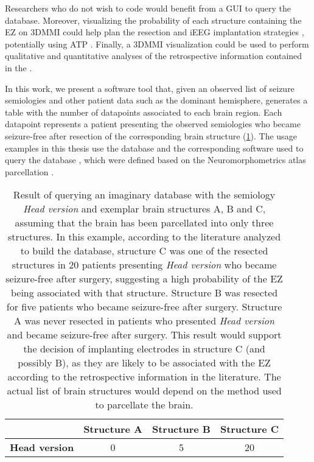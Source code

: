 Researchers who do not wish to code would benefit from a \ac{GUI} to query the database.
Moreover, visualizing the probability of each structure containing the \ac{EZ} on \ac{3DMMI} could help plan the resection and \ac{iEEG} implantation strategies \cite{nowell_resection_2017, nowell_utility_2015}, potentially using \ac{ATP} \cite{sparks_automated_2017}.
Finally, a \ac{3DMMI} visualization could be used to perform qualitative and quantitative analyses of the retrospective information contained in the \svtdatabase.

In this work, we present a software tool that, given an observed list of seizure semiologies and other patient data such as the dominant hemisphere, generates a table with the number of datapoints associated to each brain region.
Each datapoint represents a patient presenting the observed semiologies who became seizure-free after resection of the corresponding brain structure (\cref{tab:single_semiology}).
The usage examples in this thesis use the \svtdatabase database and the corresponding software used to query the database \cite{alim-marvasti_probabilistic_2021,alim-marvasti_mapping_2021}, which were defined based on the Neuromorphometrics atlas parcellation%
.

\begin{table}
  \setlength{\tabcolsep}{3pt}
  \centering
  \caption[Result of querying an imaginary database with one semiology]{
    Result of querying an imaginary database with the semiology \textit{Head version} and exemplar brain structures A, B and C, assuming that the brain has been parcellated into only three structures.
    In this example, according to the literature analyzed to build the database, structure C was one of the resected structures in 20 patients presenting \textit{Head version} who became seizure-free after surgery, suggesting a high probability of the \ac{EZ} being associated with that structure.
    Structure B was resected for five patients who became seizure-free after surgery.
    Structure A was never resected in patients who presented \textit{Head version} and became seizure-free after surgery.
    This result would support the decision of implanting electrodes in structure C (and possibly B), as they are likely to be associated with the \ac{EZ} according to the retrospective information in the literature.
    The actual list of brain structures would depend on the method used to parcellate the brain.
  }
  \label{tab:single_semiology}
  \begin{tabular}{l*3c}
    \toprule
                          & \textbf{Structure A} & \textbf{Structure B} & \textbf{Structure C} \\
    \midrule
    \textbf{Head version} &                    0 &                    5 &                   20 \\
  \end{tabular}
\end{table}

